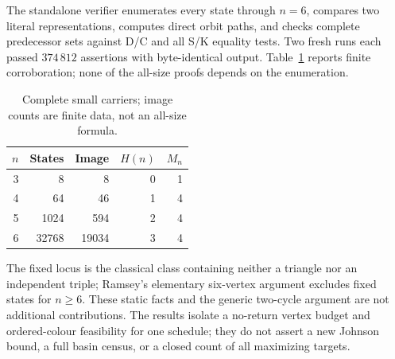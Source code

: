 \documentclass[a4paper,10pt]{amsart}
\theoremstyle{remark}
\begin{document}
The standalone verifier enumerates every state through $n=6$, compares
two literal representations, computes direct orbit paths, and checks
complete predecessor sets against D/C and all S/K equality tests.
Two fresh runs each passed $374\,812$ assertions with byte-identical
output. Table~\ref{tab:checks} reports finite corroboration; none of the
all-size proofs depends on the enumeration.
\begin{table}[h]
\centering
\caption{Complete small carriers; image counts are finite data, not an all-size formula.}
\label{tab:checks}
\begin{tabular}{rrrrr}
\toprule
$n$ & States & Image & $H(n)$ & $M_n$\\
\midrule
3&8&8&0&1\\
4&64&46&1&4\\
5&1024&594&2&4\\
6&32768&19034&3&4\\
\bottomrule
\end{tabular}
\end{table}
The fixed locus is the classical class containing neither a triangle nor
an independent triple; Ramsey's elementary six-vertex argument excludes
fixed states for $n\ge6$. These static facts and the generic two-cycle
argument are not additional contributions. The results isolate a
no-return vertex budget and ordered-colour feasibility for one schedule;
they do not assert a new Johnson bound, a full basin census, or a closed
count of all maximizing targets.



\end{document}
